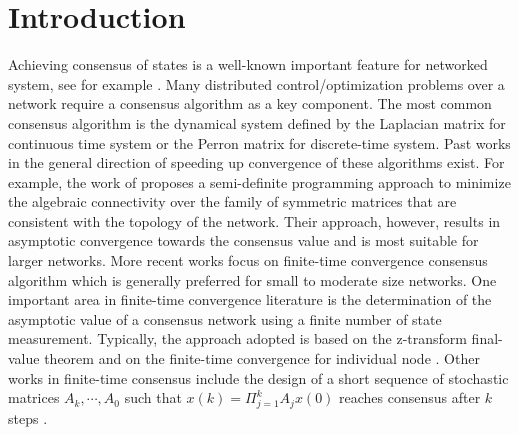 \documentclass[onecolumn,reviewcopy]{autart}
\begin{document}
%














\section{Introduction}

Achieving consensus of states is a well-known important feature for networked system, see for example \citep{ART:OM04,BOO:RB07}. Many distributed control/optimization problems over a network require a consensus algorithm as a key component.
The most common consensus algorithm is the dynamical system defined by the Laplacian matrix for continuous time system or the Perron matrix for discrete-time system. Past works in the general direction of speeding up convergence of these algorithms exist.  For example, the work of \citep{ART:XB04} proposes a semi-definite programming approach to minimize the algebraic connectivity over the family of symmetric matrices that are consistent with the topology of the network. Their approach, however, results in asymptotic convergence towards the consensus value and is most suitable for larger networks. More recent works focus on finite-time convergence consensus algorithm  \citep{INP:SH07,INP:YSSG09, ART:WX10,ART:YSSBG13,ART:HJOV14,ART:HSJ15} which is generally preferred for small to moderate size networks. One important area in finite-time convergence literature is the determination of the asymptotic value of a consensus network using a finite number of state measurement. Typically, the approach adopted is based on the z-transform final-value theorem and on the finite-time convergence for  individual node \citep{INP:SH07,INP:YSSG09,ART:YSSBG13}.  Other works in finite-time consensus include the design of a short sequence of stochastic matrices $A_k, \cdots, A_0$ such that $x(k)= \Pi_{j=1}^{k} A_j x(0)$ reaches consensus after $k$ steps \citep{INP:KS09,ART:HSJ15}.
\end{document}
